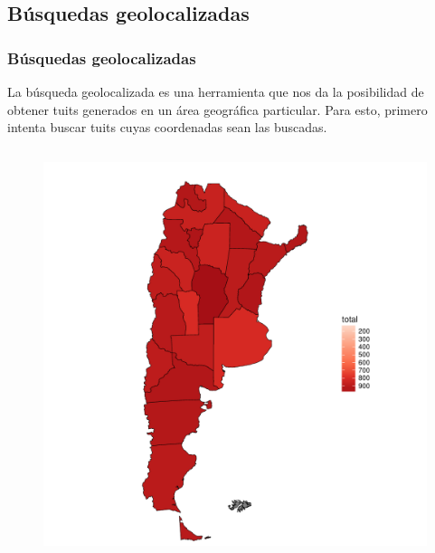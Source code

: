 \subsection{Búsquedas geolocalizadas}


\begin{frame}[t]\frametitle{Búsquedas geolocalizadas}

La búsqueda geolocalizada es una herramienta que nos da la posibilidad de obtener tuits generados en un área geográfica particular. Para esto, primero intenta buscar tuits cuyas coordenadas sean las buscadas.


\begin{columns}
    \begin{column}{0.30\textwidth}
        \begin{figure}
            \includegraphics[width=\linewidth]{../src/images/mapaprovincias.pdf}
            \label{fig:mapaProvincias}
        \end{figure}
    \end{column}


\end{columns}
\end{frame}
